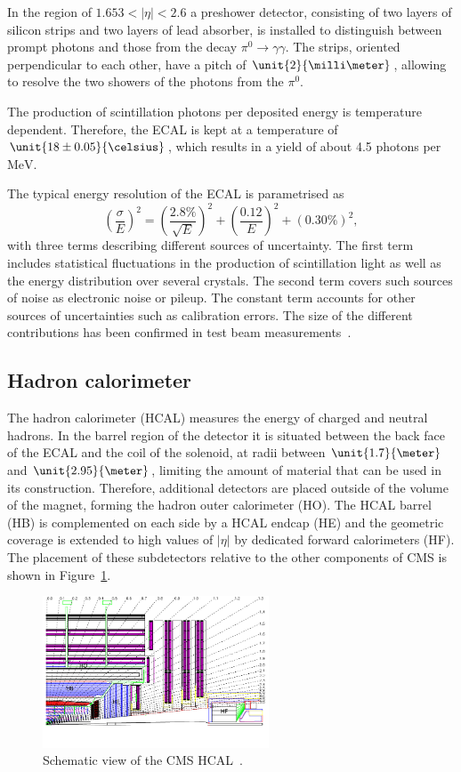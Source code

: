 In the region of $1.653 < \vert \eta \vert < 2.6$ a preshower detector, consisting of two layers of silicon strips and two layers of lead absorber, is installed to distinguish between prompt photons and those from the decay $\pi^0 \rightarrow \gamma\gamma$. The strips, oriented perpendicular to each other, have a pitch of $\unit{2}{\milli\meter}$, allowing to resolve the two showers of the photons from the $\pi^0$. 

The production of scintillation photons per deposited energy is temperature dependent. Therefore, the ECAL is kept at a temperature of $\unit{18\pm0.05}{\celsius}$, which results in a yield of about 4.5 photons per $\mathrm{MeV}$. 

The typical energy resolution of the ECAL is parametrised as
\begin{equation}
\left(\frac{\sigma}{E}\right)^2 = \left( \frac{2.8\%}{\sqrt{E}}\right)^2 + \left( \frac{0.12}{E} \right)^2 + (0.30\%)^2,
\end{equation}
with three terms describing different sources of uncertainty. The first term includes statistical fluctuations in the production of scintillation light as well as the energy distribution over several crystals. The second term covers such sources of noise as electronic noise or pileup. The constant term accounts for other sources of uncertainties such as calibration errors. The size of the different contributions has been confirmed in test beam measurements~\cite{EGM-10-003}. 
\subsection{Hadron calorimeter}
The hadron calorimeter (HCAL) measures the energy of charged and neutral hadrons. In the barrel region of the detector it is situated between the back face of the ECAL and the coil of the solenoid, at radii between $\unit{1.7}{\meter}$ and $\unit{2.95}{\meter}$, limiting the amount of material that can be used in its construction. Therefore, additional detectors are placed outside of the volume of the magnet, forming the hadron outer calorimeter (HO). The HCAL barrel (HB) is complemented on each side by a HCAL endcap (HE) and the geometric coverage is extended to high values of $\vert \eta \vert$ by dedicated forward calorimeters (HF). The placement of these subdetectors relative to the other components of CMS is shown in Figure~\ref{fig:HCAL}.
\begin{figure}[htbp]
\centering
  \includegraphics[width=0.6\textwidth]{plots/CMS/HCAL.png}
\caption{Schematic view of the CMS HCAL~\cite{CMS}.}
\label{fig:HCAL}
\end{figure} 
